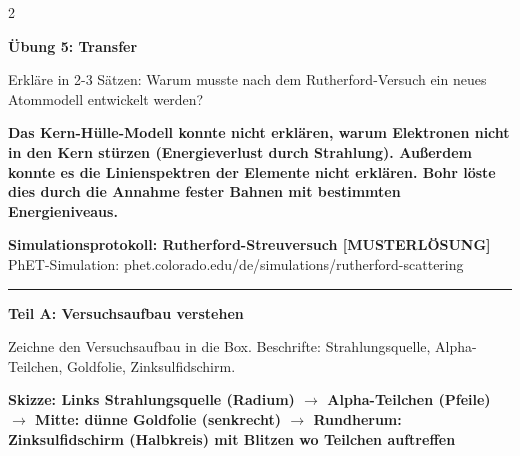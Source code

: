 \documentclass[10pt, a4paper]{article}
\newcommand{\fachfarbe}{physik}
\newcommand{\lsg}[1]{\textcolor{loesung}{\textbf{#1}}}
\newcommand{\abschnitt}[1]{%
    \vspace{8pt}
    \noindent\textbf{\textcolor{\fachfarbe}{#1}}
    \vspace{4pt}
}
\begin{document}
\begin{multicols}{2}
\vspace{8pt}


\abschnitt{Übung 5: Transfer}

Erkläre in 2-3 Sätzen: Warum musste nach dem Rutherford-Versuch ein neues Atommodell entwickelt werden?

\vspace{4pt}

\lsg{Das Kern-Hülle-Modell konnte nicht erklären, warum Elektronen nicht in den Kern stürzen (Energieverlust durch Strahlung). Außerdem konnte es die Linienspektren der Elemente nicht erklären. Bohr löste dies durch die Annahme fester Bahnen mit bestimmten Energieniveaus.}

\end{multicols}


\newpage

\begin{center}
{\large\bfseries Simulationsprotokoll: Rutherford-Streuversuch \textcolor{loesung}{[MUSTERLÖSUNG]}}\\[2pt]
{\small\textcolor{grau}{PhET-Simulation: phet.colorado.edu/de/simulations/rutherford-scattering}}
\end{center}

\vspace{-2pt}
\hrule
\vspace{12pt}


\abschnitt{Teil A: Versuchsaufbau verstehen}

\begin{merksatz}
Zeichne den Versuchsaufbau in die Box. Beschrifte: Strahlungsquelle, Alpha-Teilchen, Goldfolie, Zinksulfidschirm.

\vspace{6pt}
\lsg{Skizze: Links Strahlungsquelle (Radium) $\rightarrow$ Alpha-Teilchen (Pfeile) $\rightarrow$ Mitte: dünne Goldfolie (senkrecht) $\rightarrow$ Rundherum: Zinksulfidschirm (Halbkreis) mit Blitzen wo Teilchen auftreffen}
\vspace{40pt}

\end{merksatz}
\end{document}
